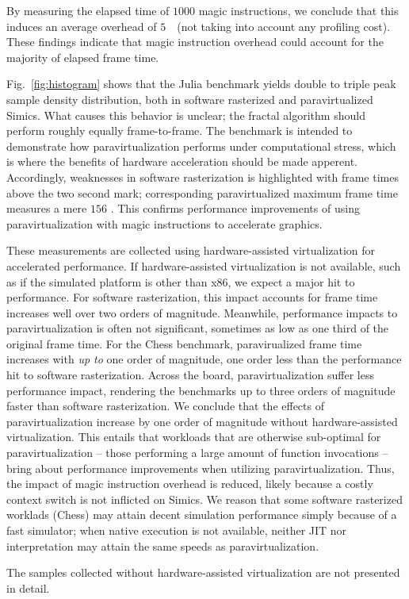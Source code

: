 By measuring the elapsed time of $1000$ magic instructions, we conclude that this induces an average overhead of $5$~\milli\second\ (not taking into account any profiling cost).
These findings indicate that magic instruction overhead could account for the majority of elapsed frame time.

Fig.~\ref{fig:histogram} shows that the Julia benchmark yields double to triple peak sample density distribution, both in software rasterized and paravirtualized Simics.
What causes this behavior is unclear; the fractal algorithm should perform roughly equally frame-to-frame.
The benchmark is intended to demonstrate how paravirtualization performs under computational stress, which is where the benefits of hardware acceleration should be made apperent.
Accordingly, weaknesses in software rasterization is highlighted with frame times above the two second mark; corresponding paravirtualized maximum frame time measures a mere $156$ \milli\second.
This confirms performance improvements of using paravirtualization with magic instructions to accelerate graphics.

These measurements are collected using hardware-assisted virtualization for accelerated performance.
If hardware-assisted virtualization is not available, such as if the simulated platform is other than x86, we expect a major hit to performance.
For software rasterization, this impact accounts for frame time increases well over two orders of magnitude.
Meanwhile, performance impacts to paravirtualization is often not significant, sometimes as low as one third of the original frame time.
For the Chess benchmark, paravirualized frame time increases with \textit{up to} one order of magnitude, one order less than the performance hit to software rasterization.
Across the board, paravirtualization suffer less performance impact, rendering the benchmarks up to three orders of magnitude faster than software rasterization.
We conclude that the effects of paravirtualization increase by one order of magnitude without hardware-assisted virtualization.
This entails that workloads that are otherwise sub-optimal for paravirtualization -- those performing a large amount of function invocations -- bring about performance improvements when utilizing paravirtualization.
Thus, the impact of magic instruction overhead is reduced, likely because a costly context switch is not inflicted on Simics.
We reason that some software rasterized worklads (Chess) may attain decent simulation performance simply because of a fast simulator; when native execution is not available, neither JIT nor interpretation may attain the same speeds as paravirtualization.

The samples collected without hardware-assisted virtualization are not presented in detail. %
